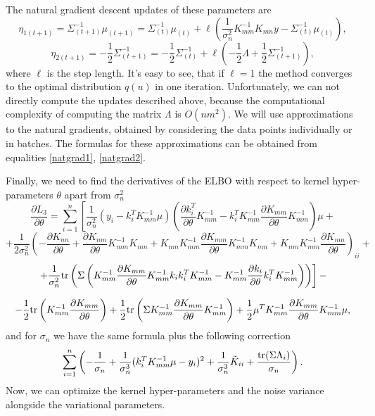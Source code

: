 The natural gradient descent updates of these parameters are
$$\eta_{1(t+1)} = \Sigma_{(t+1)}^{-1} \mu_{(t+1)} = \Sigma_{(t)}^{-1} \mu_{(t)} + \ell \left(\frac 1 {\sigma_n^2} K_{mm}^{-1} K_{mn} y - \Sigma_{(t)}^{-1} \mu_{(t)} \right), $$
$$\eta_{2 (t+1)} = -\frac 1 2 \Sigma_{(t+1)}^{-1} = -\frac 1 2 \Sigma_{(t)}^{-1}  + \ell \left( -\frac 1 2 \Lambda + \frac 1 2 \Sigma_{(t+1)}^{-1}\right),$$
where $\ell$ is the step length. It's easy to see, that if $\ell = 1$ the method converges to the optimal distribution $q(u)$ in one iteration. Unfortunately, we can not directly compute the updates described above, because the computational complexity of computing the matrix $\Lambda$ is $O(n m^2)$. We will use approximations to the natural gradients, obtained by considering the data points individually or in batches. The formulas for these approximations can be obtained from equalities \ref{natgrad1}, \ref{natgrad2}.

Finally, we need to find the derivatives of the ELBO with respect to kernel hyper-parameters $\theta$ apart from $\sigma_n^2$
$$\frac{\partial L_3} {\partial \theta} = \sum_{i = 1}^n \left [ \frac 1 {\sigma_n^2} (y_i - k_i^T K_{mm}^{-1} \mu) \left(\frac{\partial k_i^T}{\partial \theta} K_{mm}^{-1} - k_i^T K_{mm}^{-1} \frac{\partial K_{mm}}{\partial \theta} K_{mm}^{-1} \right)\mu + \right.$$
$$\left. +\frac 1 {2 \sigma_n^2} \left (- \frac{\partial K_{nn}}{\partial \theta} +  \frac{\partial K_{nm}}{\partial \theta} K_{mm}^{-1} K_{mn} + K_{nm} K_{mm}^{-1} \frac{\partial K_{mm}}{\partial \theta} K_{mm}^{-1} K_{mn} + K_{nm} K_{mm}^{-1} \frac{\partial K_{mn}}{\partial \theta}\right)_ {ii} + \right.$$
$$\left. +  \frac 1 {\sigma_n^2} \mbox{tr}\left( \Sigma \left( K_{mm}^{-1} \frac{\partial K_{mm}}{\partial \theta} K_{mm}^{-1} k_i k_i^T K_{mm}^{-1}  -  K_{mm}^{-1} \frac{\partial k_{i}}{\partial \theta}k_i^T K_{mm}^{-1}\right)\right)\right] - $$

$$ - \frac 1 2 \mbox{tr}\left(K_{mm}^{-1} \frac{\partial K_{mm}}{\partial \theta}\right) + \frac 1 2 \mbox{tr}\left(\Sigma K_{mm}^{-1} \frac{\partial K_{mm}}{\partial \theta} K_{mm}^{-1} \right)+ \frac 1 2 \mu^T K_{mm}^{-1} \frac{\partial K_{mm}}{\partial \theta} K_{mm}^{-1}\mu,$$
and for $\sigma_n$ we have the same formula plus the following correction
$$\sum_{i = 1}^{n} \left(-\frac{1}{\sigma_n} + \frac 1 {\sigma_n^3} (k_i^T K_{mm}^{-1} \mu - y_i)^2 + \frac 1 {\sigma_n^3} \tilde K_{ii} + \frac {\mbox{tr}(\Sigma \Lambda_i)}{\sigma_n}\right).$$
Now, we can optimize the kernel hyper-parameters and the noise variance alongside the variational parameters. 

